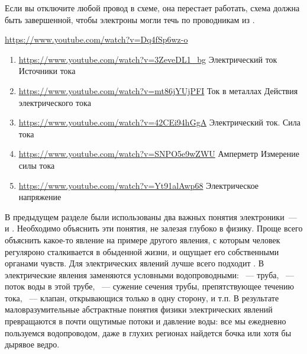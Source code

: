 \bigskip
Если вы отключите любой провод в схеме, она перестает работать, схема должна
быть завершенной, чтобы электроны могли течь по проводникам из
.

\label{bctok}

\begin{youtube}

\url{https://www.youtube.com/watch?v=Dq4fSp6wz-o}

\begin{enumerate}[nosep]
  \item \url{https://www.youtube.com/watch?v=3ZeveDL1\_bg}
  Электрический ток Источники тока
  \item \url{https://www.youtube.com/watch?v=mt86jYUjPFI}
  Ток в металлах Действия электрического тока 
  \item \url{https://www.youtube.com/watch?v=42CEi94hGgA}
  Электрический ток. Сила тока
  \item \url{https://www.youtube.com/watch?v=SNPO5e9wZWU}
  Амперметр Измерение силы тока
  \item \url{https://www.youtube.com/watch?v=Yt91alAwp68}
  Электрическое напряжение
\end{enumerate}

\end{youtube}

В предыдущем разделе были использованы два важных понятия электроники\ ---
 и . Необходимо объяснить эти
понятия, не залезая глубоко в физику. Проще всего объяснить какое-то явление на
примере другого явления, с которым человек регуляроно сталкивается в обыденной
жизни, и ощущает его собственными органами чувств. Для электрических явлений
лучше всего подходит .
В  электрические явления заменяются условными водопроводными:
\ --- труба, \ --- поток воды в этой трубе,
\ --- сужение сечения трубы, препятствующее течению
тока, \ --- клапан, открывающися только в одну сторону, и
т.п. В результате маловразумительные абстрактные понятия физики электрических
явлений превращаются в почти ощутимые потоки и давление воды: все мы ежедневно
пользуемся водопроводом, даже в глухих регионах найдется бочка или хотя
бы дырявое ведро.

